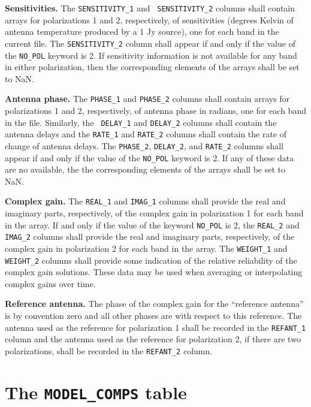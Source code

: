 \documentclass[twoside]{article}
\begin{document}
{\bf Sensitivities.}  The {\tt SENSITIVITY\_1} and {\tt
  SENSITIVITY\_2} columns shall contain arrays for polarizations 1 and
2, respectively, of sensitivities (degrees Kelvin of antenna
temperature produced by a 1 Jy source), one for each band in the
current file.  The {\tt SENSITIVITY\_2} column shall appear if and
only if the value of the {\tt NO\_POL} keyword is 2.  If sensitivity
information is not available for any band in either polarization, then
the corresponding elements of the arrays shall be set to NaN\@.

{\bf Antenna phase.} The {\tt PHASE\_1} and {\tt PHASE\_2} columns
shall contain arrays for polarizations 1 and 2, respectively, of antenna
phase in radians, one for each band in the file.  Similarly, the {\tt
DELAY\_1} and {\tt DELAY\_2} columns shall contain the antenna delays
and the {\tt RATE\_1} and {\tt RATE\_2} columns shall contain the rate
of change of antenna delays.  The {\tt PHASE\_2}, {\tt DELAY\_2}, and
{\tt RATE\_2} columns shall appear if and only if the value of the
{\tt NO\_POL} keyword is 2.  If any of these data are no available,
the the corresponding elements of the arrays shall be set to NaN\@.

{\bf Complex gain.} The {\tt REAL\_1} and {\tt IMAG\_1} columns shall
provide the real and imaginary parts, respectively, of the complex
gain in polarization 1 for each band in the array.  If and only if the
value of the keyword {\tt NO\_POL} is 2, the {\tt REAL\_2} and {\tt
  IMAG\_2} columns shall provide the real and imaginary parts,
respectively, of the complex gain in polarization 2 for each band in
the array.  The {\tt WEIGHT\_1} and {\tt WEIGHT\_2} columns shall
provide some indication of the relative reliability of the complex
gain solutions.  These data may be used when averaging or
interpolating complex gains over time.

{\bf Reference antenna.}  The phase of the complex gain for the
``reference antenna'' is by convention zero and all other phases are
with respect to this reference.  The antenna used as the reference for
polarization 1 shall be recorded in the {\tt REFANT\_1} column and the
antenna used as the reference for polarization 2, if there are two
polarizations, shall be recorded in the {\tt REFANT\_2} column.

\section{The {\tt MODEL\_COMPS} table}
\label{s:MC}
\end{document}
